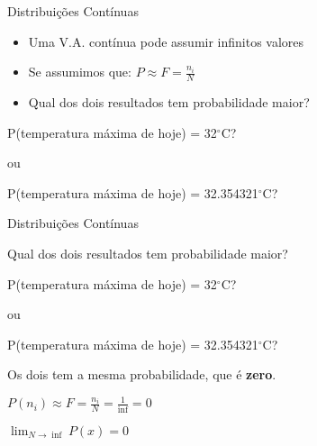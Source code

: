 \documentclass{beamer}
\begin{document}
\begin{frame}{Distribuições Contínuas}

\begin{itemize}
  \item Uma V.A. contínua pode assumir infinitos valores
  
  \vfill
  
  \item Se assumimos que: $P \approx F = \frac{n_i}{N}$
  
  \vfill
  
  \item Qual dos dois resultados tem probabilidade maior?
  
  \end{itemize}

\centering
  P(temperatura máxima de hoje) =  32$^\circ$C?
  
  ou
  
  P(temperatura máxima de hoje) = 32.354321$^\circ$C?
  
\end{frame} 


\begin{frame}{Distribuições Contínuas}

Qual dos dois resultados tem probabilidade maior?
  \vfill
\centering

P(temperatura máxima de hoje) =  32$^\circ$C?
  
ou
  
P(temperatura máxima de hoje) = 32.354321$^\circ$C?

\vfill

Os dois tem a mesma probabilidade, que é \textbf{zero}.


$P(n_i) \approx F = \frac{n_i}{N} = \frac{1}{\inf} = 0$

  
$ \lim_{N \to \inf} P(x) = 0$ 

\end{frame} 
\end{document}
